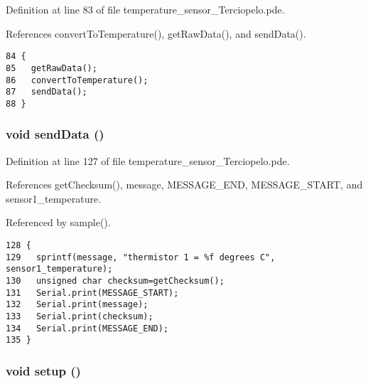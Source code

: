 Definition at line 83 of file temperature\_\-sensor\_\-Terciopelo.pde.

References convertToTemperature(), getRawData(), and sendData().

\begin{Code}\begin{verbatim}84 {
85   getRawData();
86   convertToTemperature();
87   sendData();
88 }
\end{verbatim}
\end{Code}


\hypertarget{temperature__sensor___terciopelo_8pde_95b1b253ee46df6a93285803cf1f3370}{
\subsubsection[{sendData}]{\setlength{\rightskip}{0pt plus 5cm}void sendData ()}}
\label{temperature__sensor___terciopelo_8pde_95b1b253ee46df6a93285803cf1f3370}




Definition at line 127 of file temperature\_\-sensor\_\-Terciopelo.pde.

References getChecksum(), message, MESSAGE\_\-END, MESSAGE\_\-START, and sensor1\_\-temperature.

Referenced by sample().

\begin{Code}\begin{verbatim}128 {
129   sprintf(message, "thermistor 1 = %f degrees C", sensor1_temperature);
130   unsigned char checksum=getChecksum();
131   Serial.print(MESSAGE_START);
132   Serial.print(message);
133   Serial.print(checksum);
134   Serial.print(MESSAGE_END);
135 }
\end{verbatim}
\end{Code}


\hypertarget{temperature__sensor___terciopelo_8pde_4fc01d736fe50cf5b977f755b675f11d}{
\subsubsection[{setup}]{\setlength{\rightskip}{0pt plus 5cm}void setup ()}}
\label{temperature__sensor___terciopelo_8pde_4fc01d736fe50cf5b977f755b675f11d}


